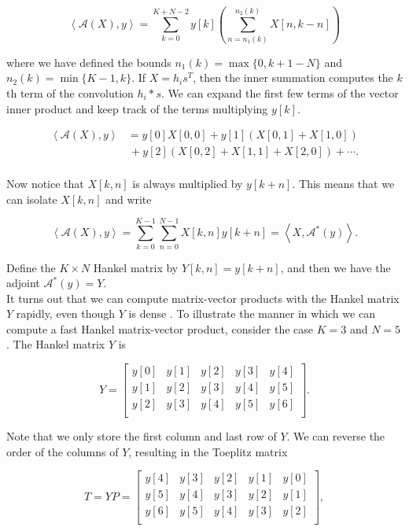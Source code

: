 \documentclass[journal]{IEEEtran}
\begin{document}
\[ \left\langle \mathcal{A}(X),y\right\rangle = \sum_{k=0}^{K+N-2}y[k] \left(\sum_{n=n_1(k)}^{n_2(k)} X[n,k-n]\right) \] 

\noindent where we have defined the bounds ${n_1(k) = {\max\{0,k+1-N\}}}$ and ${n_2(k) = {\min\{K-1,k\}}}$.  If $X=h_is^T$, then the inner summation computes the $k$th term of the convolution $h_i\ast s$.  We can expand the first few terms of the vector inner product and keep track of the terms multiplying $y[k]$.

\begin{align*}
   \left\langle\mathcal{A}(X),y\right\rangle &= y[0]X[0,0] + y[1]\left(X[0,1]+X[1,0]\right)\\
                                             &\,+ y[2]\left(X[0,2] + X[1,1] + X[2,0]\right) + \cdots.\\
\end{align*}

\noindent Now notice that $X[k,n]$ is always multiplied by $y[k+n]$.  This means that we can isolate $X[k,n]$ and write

\[ \left\langle\mathcal{A}(X),y\right\rangle = \sum_{k=0}^{K-1}\sum_{n=0}^{N-1} X[k,n]y[k+n] = \left\langle X,\mathcal{A}^\ast(y)\right\rangle. \] 

\noindent Define the $K\times N$ Hankel matrix by $Y[k,n] = y[k+n]$, and then we have the adjoint $\mathcal{A}^\ast(y) = Y$.\\

It turns out that we can compute matrix-vector products with the Hankel matrix $Y$ rapidly, even though $Y$ is dense \cite{golub_1996}.  To illustrate the manner in which we can compute a fast Hankel matrix-vector product, consider the case $K=3$ and $N=5$.  The Hankel matrix $Y$ is

   \[ Y = \begin{bmatrix} y[0] & y[1] & y[2] & y[3] & y[4]\\
                          y[1] & y[2] & y[3] & y[4] & y[5]\\
                          y[2] & y[3] & y[4] & y[5] & y[6]\\\end{bmatrix}. \] 

\noindent Note that we only store the first column and last row of $Y$.  We can reverse the order of the columns of $Y$, resulting in the Toeplitz matrix

\[ T = YP = \begin{bmatrix}
       y[4] & y[3] & y[2] & y[1] & y[0]\\
       y[5] & y[4] & y[3] & y[2] & y[1]\\
       y[6] & y[5] & y[4] & y[3] & y[2]\\\end{bmatrix}, \] 
\end{document}
